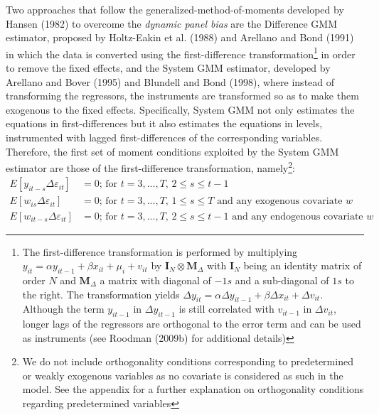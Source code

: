 Two approaches that follow the generalized-method-of-moments developed by Hansen (1982) to overcome the \emph{dynamic panel bias} are the Difference GMM estimator, proposed by Holtz-Eakin et al. (1988) and Arellano and Bond (1991) in which the data is converted using the first-difference transformation\footnote{The first-difference transformation is performed by multiplying $y_{it}=\alpha y_{it-1} + \beta x_{it} + \mu_i+v_{it}$ by $\mathbf{I}_N \otimes \mathbf{M}_{\Delta}$ with $\mathbf{I}_N$ being an identity matrix of order $N$ and $\mathbf{M}_{\Delta}$ a matrix with diagonal of $-1s$ and a sub-diagonal of $1s$ to the right. The transformation yields $\Delta y_{it}=\alpha \Delta y_{it-1} + \beta \Delta x_{it} +\Delta v_{it}$. Although the term $y_{it-1}$ in $\Delta y_{it-1}$ is still correlated with $v_{it-1}$ in $\Delta v_{it}$, longer lags of the regressors are orthogonal to the error term and can be used as instruments (see Roodman (2009b) for additional details)} in order to remove the fixed effects, and the System GMM estimator, developed by Arellano and Bover (1995) and Blundell and Bond (1998), where instead of transforming the regressors, the instruments are transformed so as to make them exogenous to the fixed effects. Specifically, System GMM not only estimates the equations in first-differences but it also estimates the equations in levels, instrumented with lagged first-differences of the corresponding variables. Therefore, the first set of moment conditions exploited by the System GMM estimator are those of the first-difference transformation, namely\footnote{We do not include orthogonality conditions corresponding to predetermined or weakly exogenous variables as no covariate is considered as such in the model. See the appendix for a further explanation on orthogonality conditions regarding predetermined variables}:
\begin{equation}
\label{momentsDiff}
\begin{aligned}
E\left[ y_{it-s}\Delta \varepsilon_{it}\right]&=0 \text{; for $t=3,...,T$, $2\leq s \leq t-1$}\\
E\left[w_{is}\Delta \varepsilon_{it}\right]&=0 \text{; for $t=3,...,T$, $1\leq s \leq T$ and any exogenous covariate $w$}\\
E\left[w_{it-s}\Delta \varepsilon_{it}\right]&=0 \text{; for $t=3,...,T$, $2\leq s \leq t-1$ and any endogenous covariate $w$}
\end{aligned}
\end{equation}

